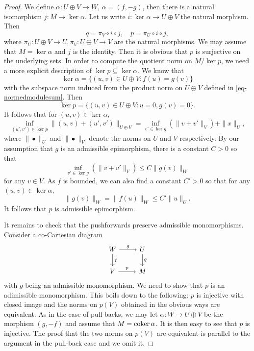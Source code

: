 \begin{proof}
    We define $\alpha:U\oplus V\rightarrow W$, $\alpha=(f,-g)$, then there is a natural isomorphism $j:M\rightarrow \ker \alpha$. Let us write $i:\ker \alpha\rightarrow U\oplus V$ the natural morphism. Then
    \[
        q=\pi_V\circ i \circ j,\quad p=\pi_U\circ i \circ j,  
    \]
    where $\pi_U:U\oplus V\rightarrow U,\pi_V:U\oplus V\rightarrow V$ are the natural morphisms. We may assume that $M=\ker \alpha$ and $j$ is the identity. Then it is obvious that $p$ is surjective on the underlying sets. In order to compute the quotient norm on  $M/\ker p$, we need a more explicit description of $\ker p\subseteq \ker \alpha$. We know that 
    \[
        \ker \alpha=\{(u,v)\in U\oplus V: f(u)=g(v)\}  
    \]
    with the subspace norm induced from the product norm on $U\oplus V$ defined in \eqref{eq-normedmodulesum}. Then
    \[
        \ker p=\{(u,v)\in U\oplus V:u=0, g(v)=0\}.    
    \]
    It follows that for $(u,v)\in \ker \alpha$,
    \[
        \inf_{(u',v')\in \ker p} \|(u,v)+(u',v')\|_{U\oplus V}=\inf_{v'\in \ker g} (\|v+v'\|_V)+ \|x\|_U,
    \]
    where $\|\bullet\|_U$ and $\|\bullet\|_V$ denote the norms on $U$ and $V$ respectively. By our assumption that $g$ is an admissible epimorphism, there is a constant $C>0$ so that 
    \[
        \inf_{v'\in \ker g} (\|v+v'\|_V)\leq C\|g(v)\|_W
    \]
    for any $v\in V$.
    As $f$ is bounded, we can also find a constant $C'>0$ so that for any $(u,v)\in \ker \alpha$, 
    \[
        \|g(v)\|_W=\|f(u)\|_W\leq C'\|u\|_U.
    \]
    It follows that $p$ is admissible epimorphism.

    It remains to check that the pushforwards preserve admissible monomorphisms. Consider a co-Cartesian diagram
    \[
        \begin{tikzcd}
            W \arrow[r, "g"] \arrow[d, "f"]  & U \arrow[d, "q"] \\
            V \arrow[r, "p"]                                               & M               
        \end{tikzcd}  
    \]
    with $g$ being an admissible monomorphism. We need to show that $p$ is an adimissible monomorphism. This boils down to the following: $p$ is injective with closed image and the norms on $p(V)$ obtained in the obvious ways are equivalent.
    As in the case of pull-backs, we may let $\alpha:W\rightarrow U\oplus V$ be the  morphism $(g,-f)$ and assume that $M=\operatorname{coker} \alpha$. It is then easy to see that $p$ is injective. The proof that the two norms on $p(V)$ are equivalent is parallel to the argument in the pull-back case and we omit it.


\end{proof}

